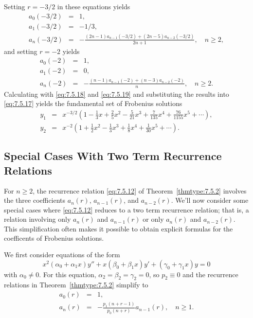 \documentclass{ximera}
\begin{document}
\begin{example}
\begin{explanation}
Setting $r=-3/2$ in these equations yields
\begin{equation} \label{eq:7.5.18}
\begin{array}{ccl}
a_0(-3/2)&=&1,\\
a_1(-3/2)&=&-1/3,\\
a_n(-3/2)&=&-\frac{(2n-1)a_{n-1}(-3/2)+
(2n-5)a_{n-2}(-3/2)}{2n+1},\quad n\geq2,
\end{array}
\end{equation}
and setting $r=-2$ yields
\begin{equation} \label{eq:7.5.19}
\begin{array}{ccl}
a_0(-2)&=&1,\\
a_1(-2)&=&0,\\
a_n(-2)&=&-\frac{(n-1)a_{n-1}(-2)+(n-3)a_{n-2}(-2)}{n},\quad n\geq2.
\end{array}
\end{equation}
Calculating  with  \eqref{eq:7.5.18} and
\eqref{eq:7.5.19}  and substituting the results into
\eqref{eq:7.5.17}   yields the fundamental set of  Frobenius
solutions
\begin{eqnarray*}
y_1&=&x^{-3/2}\left(1-\frac{1}{3}x+\frac{2}{5}x^2-\frac{5}{21}x^3
+\frac{7}{135}x^4+\frac{76}{1155}x^5+\cdots\right),\\
y_2&=&x^{-2}\left(1+\frac{1}{2}x^2-\frac{1}{3}x^3+\frac{1}{8}x^4+\frac{1}{30}x^5
+\cdots\right).
\end{eqnarray*}
\end{explanation}
\end{example}

\subsection*{Special Cases With Two Term Recurrence Relations}

For $n\geq2$, the recurrence relation \eqref{eq:7.5.12} of
Theorem~\ref{thmtype:7.5.2} involves the three coefficients
$a_n(r)$, $a_{n-1}(r)$, and $a_{n-2}(r)$. We'll now consider some
special cases where \eqref{eq:7.5.12} reduces to a two term recurrence
relation; that is, a relation involving only $a_n(r)$ and $a_{n-1}(r)$
or only $a_n(r)$ and $a_{n-2}(r)$. This simplification often makes it
possible to obtain explicit formulas for the coefficents of Frobenius
solutions.

We first consider equations of the form
$$
x^2(\alpha_0+\alpha_1x)y''+x(\beta_0+\beta_1x)y'+(\gamma_0+\gamma_1x)y=0
$$
with $\alpha_0\neq 0$. For this equation,
$\alpha_2=\beta_2=\gamma_2=0$, so $p_2\equiv0$ and the recurrence
relations in Theorem~\ref{thmtype:7.5.2} simplify to
\begin{equation} \label{eq:7.5.20}
\begin{array}{ccl}
a_0(r)&=&1,\\
a_n(r)&=&-\frac{p_1(n+r-1)}{p_0(n+r)}a_{n-1}(r),\quad n\geq1.
\end{array}
\end{equation}
\end{document}
